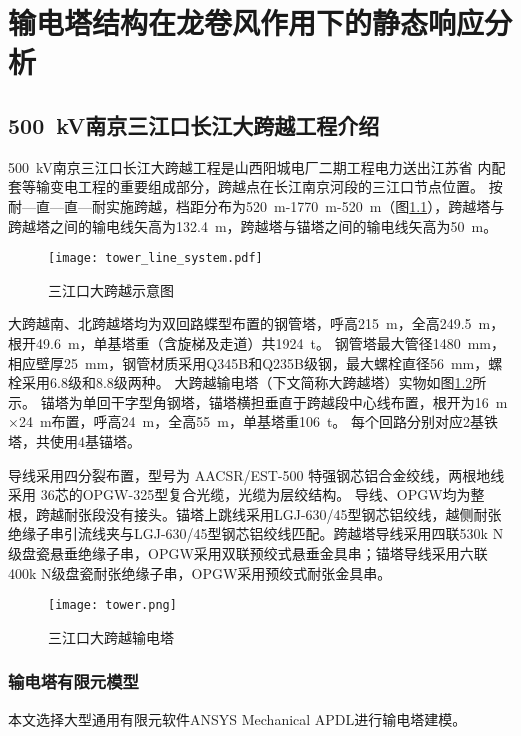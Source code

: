 \graphicspath{{figures/static/}}
\chapter{输电塔结构在龙卷风作用下的静态响应分析}\label{chapter:static}

\section{\SI{500}{kV}南京三江口长江大跨越工程介绍}
\SI{500}{kV}南京三江口长江大跨越工程是山西阳城电厂二期工程电力送出江苏省
内配套等输变电工程的重要组成部分，跨越点在长江南京河段的三江口节点位置。
按耐—直—直—耐实施跨越，档距分布为\SI{520}{m}-\SI{1770}{m}-\SI{520}{m}（图\ref{fig:tower-line}），跨越塔与跨越塔之间的输电线矢高为\SI{132.4}{m}，跨越塔与锚塔之间的输电线矢高为\SI{50}{m}。
\begin{figure}[!htbp]
	\centering
	\texttt{[image: tower\_line\_system.pdf]}
	\caption{三江口大跨越示意图}
	\label{fig:tower-line}
\end{figure}

大跨越南、北跨越塔均为双回路蝶型布置的钢管塔，呼高\SI{215}{m}，全高\SI{249.5}{m}，根开\SI{49.6}{m}，单基塔重（含旋梯及走道）共\SI{1924}{t}。
钢管塔最大管径\SI{1480}{mm}，相应壁厚\SI{25}{mm}，钢管材质采用Q345B和Q235B级钢，最大螺栓直径\SI{56}{mm}，螺栓采用6.8级和8.8级两种。
大跨越输电塔（下文简称大跨越塔）实物如图\ref{fig:real-tower}所示。
锚塔为单回干字型角钢塔，锚塔横担垂直于跨越段中心线布置，根开为\SI{16}{m}$\times$\SI{24}{m}布置，呼高\SI{24}{m}，全高\SI{55}{m}，单基塔重\SI{106}{t}。
每个回路分别对应2基铁塔，共使用4基锚塔。

导线采用四分裂布置，型号为 AACSR/EST-500 特强钢芯铝合金绞线，两根地线采用 36芯的OPGW-325型复合光缆，光缆为层绞结构。
导线、OPGW均为整根，跨越耐张段没有接头。锚塔上跳线采用LGJ-630/45型钢芯铝绞线，越侧耐张绝缘子串引流线夹与LGJ-630/45型钢芯铝绞线匹配。跨越塔导线采用四联530k N级盘瓷悬垂绝缘子串，OPGW采用双联预绞式悬垂金具串；锚塔导线采用六联400k N级盘瓷耐张绝缘子串，OPGW采用预绞式耐张金具串。
\begin{figure}[!htbp]
	\centering
	\texttt{[image: tower.png]}
	\caption{三江口大跨越输电塔}
	\label{fig:real-tower}
\end{figure}

\subsection{输电塔有限元模型}\label{sec:tower-fea}
本文选择大型通用有限元软件ANSYS Mechanical APDL进行输电塔建模。

